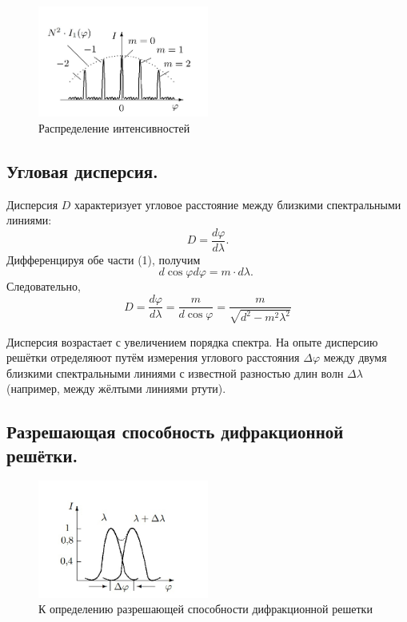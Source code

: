 \documentclass[a4paper, 12pt]{article}
\begin{document}
\begin{figure}[H]
    \centering
    \includegraphics[width=0.5\textwidth]{ris3}
    \caption{Распределение интенсивностей}
    \label{fig:ris2}
\end{figure}

\subsection*{Угловая дисперсия.} 
Дисперсия $D$ характеризует угловое расстояние между близкими спектральными линиями:
\begin{equation}
D=\frac{d \varphi}{d \lambda} .
\end{equation}
Дифференцируя обе части (1), получим
\begin{equation}
d \cos \varphi d \varphi=m \cdot d \lambda \text {. }
\end{equation}
Следовательно,
\begin{equation}
D=\frac{d \varphi}{d \lambda}=\frac{m}{d \cos \varphi}=\frac{m}{\sqrt{d^2-m^2 \lambda^2}}
\end{equation}

Дисперсия возрастает с увеличением порядка спектра. На опыте дисперсию решётки отределяюот путём измерения углового расстояния $\Delta \varphi$ между двумя близкими спектральными линиями с известной разностью длин волн $\Delta \lambda$ (например, между жёлтыми линиями ртути).
\subsection*{Разрешающая способность дифракционной решётки.}

\begin{figure}[H]
    \centering
    \includegraphics[width=0.5\textwidth]{ris4}
    \caption{К определению разрешающей способности дифракционной решетки}
    \label{fig:ris3}
\end{figure}
\end{document}
